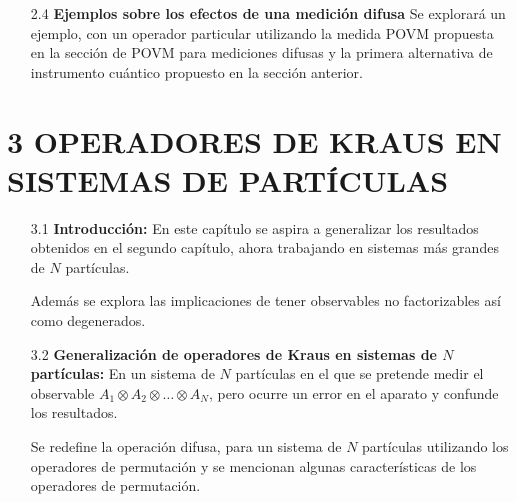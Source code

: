 \documentclass[12pt,oneside]{book}\raggedbottom{} %
\begin{document}
\begin{sloppypar}
{{\begin{itemize}
\begin{itemize}
  Se propone intuitivamente un conjunto de efectos con los que se obtiene un mapeo de las salidas de la medición difusa. Estos efectos se descomponen como operadores de Kraus, utilizando la operación raíz cuadrada debido a la positividad de los efectos. Sin embargo, esta descomposición no es única.
  \item[2.3.2] \textbf{Instrumentos cuánticos:} Se presenta la definición de una herramienta conocida como instrumento cuántico. A su vez se plantea la forma de calcular el valor esperado de la medición utilizando instrumentos cuánticos. 
  
  Se proponen dos alternativas  de instrumentos cuánticos con dos interpretaciones diferentes y sus respectivos cálculos de los valores esperados.
  \item[2.3.3] \textbf{Equivalencia de los instrumentos} En esta sección se comenta que se esperaba que los instrumentos fueran equivalentes pero resultaron distintos y por ello vale la pena proponer en qué condiciones sí lo son.
\end{itemize}
\item[2.4] \textbf{Ejemplos sobre los efectos de una medición difusa}
Se explorará un ejemplo, con un operador particular utilizando la medida POVM propuesta en la sección de POVM para mediciones difusas y la primera alternativa de instrumento cuántico propuesto en la sección anterior.
\end{itemize}
\section*{3 OPERADORES DE KRAUS EN SISTEMAS DE \texorpdfstring{}{N} PARTÍCULAS}
\begin{itemize}
\item[3.1] \textbf{Introducción:} En este capítulo se aspira a generalizar los resultados obtenidos en el segundo capítulo, ahora trabajando en sistemas más grandes de $N$ partículas.

Además se explora las implicaciones de tener observables no factorizables así como degenerados.
\item[3.2] \textbf{Generalización de operadores de Kraus en sistemas de $N$ partículas:} En un sistema de $N$ partículas en el que se pretende medir el observable $A_1\otimes A_2\otimes \hdots \otimes A_N$, pero ocurre un error en  el aparato y confunde los resultados.

Se redefine la operación difusa, para un sistema de $N$ partículas utilizando los operadores de permutación y se mencionan algunas características de los operadores de permutación. 


\end{itemize}}}
\end{sloppypar}
\end{document}
